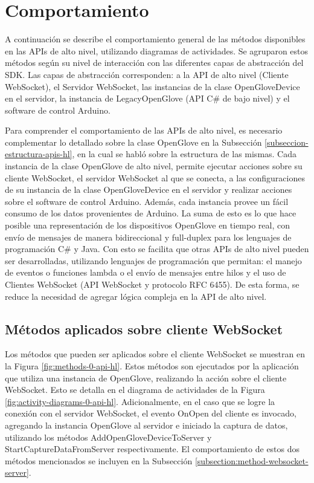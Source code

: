 \section{Comportamiento}
\label{seccion-comportamiento-apis}
A continuación se describe el comportamiento general de las métodos disponibles en las APIs de alto nivel, utilizando diagramas de actividades. Se agruparon estos métodos según su nivel de interacción con las diferentes capas de abstracción del SDK. Las capas de abstracción corresponden: a la API de alto nivel (Cliente WebSocket), el Servidor WebSocket, las instancias de la clase OpenGloveDevice en el servidor, la instancia de LegacyOpenGlove (API C\# de bajo nivel) y el software de control Arduino. 

Para comprender el comportamiento de las APIs de alto nivel, es necesario complementar lo detallado sobre la clase OpenGlove en la Subsección \ref{subseccion-estructura-apis-hl}, en la cual se habló sobre la estructura de las mismas. Cada instancia de la clase OpenGlove de alto nivel, permite ejecutar acciones sobre su cliente WebSocket, el servidor WebSocket al que se conecta, a las configuraciones de su instancia de la clase OpenGloveDevice en el servidor y realizar acciones sobre el software de control Arduino. Además, cada instancia provee un fácil consumo de los datos provenientes de Arduino. La suma de esto es lo que hace posible una representación de los dispositivos OpenGlove en tiempo real, con envío de mensajes de manera bidireccional y full-duplex para los lenguajes de programación C\# y Java. Con esto se facilita que otras APIs de alto nivel pueden ser desarrolladas, utilizando lenguajes de programación que permitan: el manejo de eventos o funciones lambda o el envío de mensajes entre hilos y el uso de Clientes WebSocket (API WebSocket y protocolo RFC 6455). De esta forma, se reduce la necesidad de agregar lógica compleja en la API de alto nivel.



\subsection{Métodos aplicados sobre cliente WebSocket}
\label{subsection:method-websocket-client}

Los métodos que pueden ser aplicados sobre el cliente WebSocket se muestran en la Figura \ref{fig:methods-0-api-hl}. Estos métodos son ejecutados por la aplicación que utiliza una instancia de OpenGlove, realizando la acción sobre el cliente WebSocket. Esto se detalla en el diagrama de actividades de la Figura \ref{fig:activity-diagrams-0-api-hl}. Adicionalmente, en el caso que se logre la conexión con el servidor WebSocket, el evento OnOpen del cliente es invocado, agregando la instancia OpenGlove al servidor e iniciado la captura de datos, utilizando los métodos AddOpenGloveDeviceToServer y StartCaptureDataFromServer respectivamente. El comportamiento de estos dos métodos mencionados se incluyen en la Subsección \ref{subsection:method-websocket-server}.


